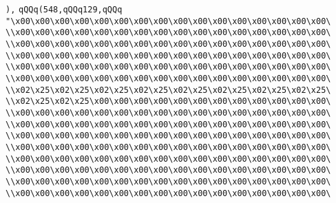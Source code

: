 \verb|),|\newline
\verb|qQQq(548,qQQq129,qQQq|\newline
\verb|"\x00\x00\x00\x00\x00\x00\x00\x00\x00\x00\x00\x00\x00\x00\x00\x00\|\newline
\verb|\\x00\x00\x00\x00\x00\x00\x00\x00\x00\x00\x00\x00\x00\x00\x00\x00\|\newline
\verb|\\x00\x00\x00\x00\x00\x00\x00\x00\x00\x00\x00\x00\x00\x00\x00\x00\|\newline
\verb|\\x00\x00\x00\x00\x00\x00\x00\x00\x00\x00\x00\x00\x00\x00\x00\x00\|\newline
\verb|\\x00\x00\x00\x00\x00\x00\x00\x00\x00\x00\x00\x00\x00\x00\x00\x00\|\newline
\verb|\\x00\x00\x00\x00\x00\x00\x00\x00\x00\x00\x00\x00\x00\x00\x00\x00\|\newline
\verb|\\x02\x25\x02\x25\x02\x25\x02\x25\x02\x25\x02\x25\x02\x25\x02\x25\|\newline
\verb|\\x02\x25\x02\x25\x00\x00\x00\x00\x00\x00\x00\x00\x00\x00\x00\x00\|\newline
\verb|\\x00\x00\x00\x00\x00\x00\x00\x00\x00\x00\x00\x00\x00\x00\x00\x00\|\newline
\verb|\\x00\x00\x00\x00\x00\x00\x00\x00\x00\x00\x00\x00\x00\x00\x00\x00\|\newline
\verb|\\x00\x00\x00\x00\x00\x00\x00\x00\x00\x00\x00\x00\x00\x00\x00\x00\|\newline
\verb|\\x00\x00\x00\x00\x00\x00\x00\x00\x00\x00\x00\x00\x00\x00\x00\x00\|\newline
\verb|\\x00\x00\x00\x00\x00\x00\x00\x00\x00\x00\x00\x00\x00\x00\x00\x00\|\newline
\verb|\\x00\x00\x00\x00\x00\x00\x00\x00\x00\x00\x00\x00\x00\x00\x00\x00\|\newline
\verb|\\x00\x00\x00\x00\x00\x00\x00\x00\x00\x00\x00\x00\x00\x00\x00\x00\|\newline
\verb|\\x00\x00\x00\x00\x00\x00\x00\x00\x00\x00\x00\x00\x00\x00\x00\x00\|\newline

